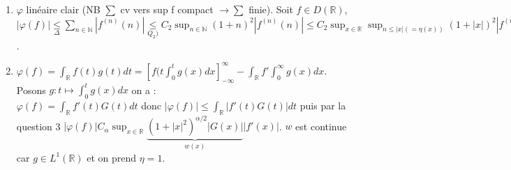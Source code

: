 \documentclass[a4paper]{article}
\begin{document}
\begin{enumerate}
    \item $\varphi $ linéaire clair (NB $\sum$ cv vers sup f compact $\to \sum$ finie). Soit $f\in D(\mathbb{R} )$, $|\varphi (f)|\underset{\Delta}{\le }\sum\limits_{n\in \mathbb{N} }^{} |f^{(n)}(n)| \underset{Q_2)}{\le }C_2\sup_{n\in \mathbb{N} }(1+n)^2|f^{(n)}(n)|\le C_2\sup_{x\in \mathbb{R} }\sup_{n\le |x|(=\eta(x))}(1+|x|)^2|f^{(n)}(x)|=C_2|f|_{w, \eta}$.

    \item $\varphi (f)=\int_\mathbb{R} f(t)g(t)dt=[f(t\int_0^tg(x)dx]_{-\infty }^\infty -\int_\mathbb{R} f'\int_0^\infty g(x)dx$. Posons $g:t\mapsto \int_0^tg(x)dx$ on a :\\
        $\varphi (f)=\int_\mathbb{R} f'(t)G(t)dt$ donc $|\varphi (f)|\le \int_\mathbb{R} |f'(t)G(t)|dt$ puis par la question 3 $|\varphi (f)|C_{\alpha }\sup_{x\in \mathbb{R} }\underbrace{(1+|x|^2)^{\alpha /2}|G(x)|}_{w(x)} |f'(x)|$. $w$ est continue car $g\in L^1(\mathbb{R} )$ et on prend $\eta=1$.


\end{enumerate}
\end{document}
